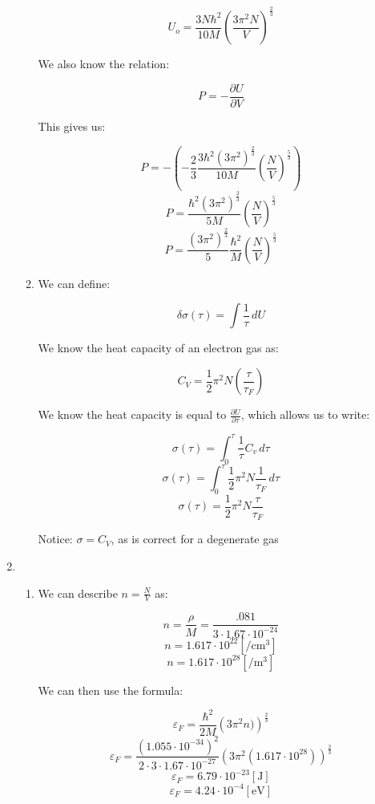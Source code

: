 \begin{enumerate}
\begin{enumerate}
        $$U_o=\frac{3N\hbar^2}{10M}\left(\frac{3\pi^2N}{V}\right)^{\frac{2}{3}}$$

        We also know the relation:

        $$P=-\frac{\partial U}{\partial V}$$

        This gives us:

        $$P=-\left( -\frac{2}{3}\frac{3\hbar^2(3\pi^2)^{\frac{2}{3}}}{10M}\left(\frac{N}{V}\right)^{\frac{5}{3}} \right)$$
        $$P=\frac{\hbar^2(3\pi^2)^{\frac{2}{3}}}{5M}\left(\frac{N}{V}\right)^{\frac{5}{3}}$$
        $$\boxed{P=\frac{(3\pi^2)^{\frac{2}{3}}}{5}\frac{\hbar^2}{M}\left(\frac{N}{V}\right)^{\frac{5}{3}}}$$

      \item 

        We can define:

        $$\delta\sigma(\tau)=\int\frac{1}{\tau}\,dU$$

        We know the heat capacity of an electron gas as:

        $$C_V=\frac{1}{2}\pi^2N\left( \frac{\tau}{\tau_F} \right)$$

        We know the heat capacity is equal to $\frac{\partial U}{\partial \tau}$, which allows us to write:

        $$\sigma(\tau)=\int_0^\tau \frac{1}{\tau}C_v\,d\tau$$
        $$\sigma(\tau)=\int_0^\tau \frac{1}{2}\pi^2N\frac{1}{\tau_F}\,d\tau$$
        $$\boxed{\sigma(\tau)=\frac{1}{2}\pi^2N\frac{\tau}{\tau_F}}$$

      Notice: $\sigma=C_V$, as is correct for a degenerate gas

    \end{enumerate}

    \setcounter{enumi}{4}

  \item

    \begin{enumerate}

      \item We can describe $n=\frac{N}{V}$ as:

        $$n=\frac{\rho}{M}=\frac{.081}{3\cdot1.67\cdot10^{-24}}$$
        $$n=1.617\cdot10^{22}\left[ \si{\per\centi\meter\cubed} \right]$$
        $$n=1.617\cdot10^{28}\left[ \si{\per\meter\cubed} \right]$$

        We can then use the formula:

        $$\varepsilon_F=\frac{\hbar^2}{2M}\left( 3\pi^2 n) \right)^{\frac{2}{3}}$$
        $$\varepsilon_F=\frac{(1.055\cdot10^{-34})^2}{2\cdot3\cdot1.67\cdot10^{-27}}\left( 3\pi^2 (1.617\cdot10^{28}) \right)^{\frac{2}{3}}$$
        $$\varepsilon_F=6.79\cdot10^{-23}[\si{\joule}]$$
        $$\boxed{\varepsilon_F=4.24\cdot10^{-4}[\si{\eV}]}$$


\end{enumerate}
\end{enumerate}
